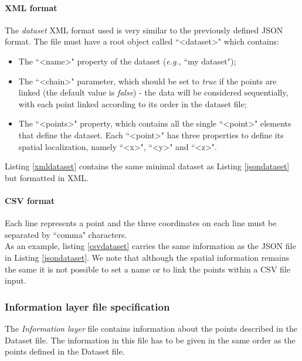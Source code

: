 \documentclass[10pt]{bmc_article}
\newenvironment{bmcformat}{\baselineskip20pt\sloppy\setboolean{publ}{false}}{\baselineskip20pt\sloppy}
\begin{document}
\begin{bmcformat}
\paragraph{XML format}
The {\it{dataset}} XML format used is very similar to the previously defined JSON format. The file must have a root object called ``<dataset>" which contains: \begin{itemize}
\item{The ``\textless name>" property of the dataset (\textit{e.g.}, ``my dataset");}
\item{The ``<chain>" parameter, which should be set to \textit{true} if the points are linked (the default value is \textit{false}) - the data will be considered sequentially, with each point linked according to its order in the dataset file;}
\item{The ``<points>" property, which contains all the single ``<point>" elements that define the dataset. Each ``<point>" has three properties to define its spatial localization, namely ``<x>", ``<y>" and ``<z>".}
\end{itemize}

Listing \ref{xmldataset} contains the same minimal dataset as Listing \ref{jsondataset} but formatted in XML.

\paragraph{CSV format}
Each line represents a point and the three coordinates on each line must be separated by ``comma" characters.\\As an example, listing \ref{csvdataset} carries the same information as the JSON file in Listing \ref{jsondataset}. We note that although the spatial information remains the same it is not possible to set a name or to link the points within a CSV file input.



\subsubsection{Information layer file specification}The {\it{Information layer}} file contains information about the points described in the Dataset file. The information in this file has to be given in the same order as the points defined in the Dataset file.


\end{bmcformat}
\end{document}
